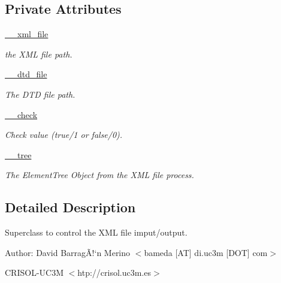 \subsection*{Private Attributes}
\begin{CompactItemize}
\item 
\hyperlink{classwinsollib_1_1DataFile_8f0afc91519f74a1b6c48d35c6de2c27}{\_\-\_\-xml\_\-file}
\begin{CompactList}\small\item\em the XML file path. \item\end{CompactList}\item 
\hyperlink{classwinsollib_1_1DataFile_385b781cf5c921e4f027140999ee1333}{\_\-\_\-dtd\_\-file}
\begin{CompactList}\small\item\em The DTD file path. \item\end{CompactList}\item 
\hyperlink{classwinsollib_1_1DataFile_e88564661aa0facb476bd06a63550b64}{\_\-\_\-check}
\begin{CompactList}\small\item\em Check value ({\em true/1\/} or {\em false/0\/}). \item\end{CompactList}\item 
\hyperlink{classwinsollib_1_1DataFile_37505659823960cd319e51a2ce74c56f}{\_\-\_\-tree}
\begin{CompactList}\small\item\em The Element\-Tree Object from the XML file process. \item\end{CompactList}\end{CompactItemize}


\subsection{Detailed Description}
Superclass to control the XML file imput/output. 

\begin{Desc}
\item[Author:]David Barrag\~{A}!`n Merino $<$bameda \mbox{[}AT\mbox{]} di.uc3m \mbox{[}DOT\mbox{]} com$>$ 

CRISOL-UC3M $<$htp://crisol.uc3m.es$>$ \end{Desc}




